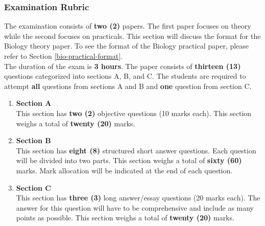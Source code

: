 \subsubsection{Examination Rubric}
\noindent The examination consists of \textbf{two (2)} papers. The first paper focuses on theory while the second focuses on practicals. This section will discuss the format for the Biology theory paper. To see the format of the Biology practical paper, please refer to Section \ref{bio-practical-format}. \\

\noindent The duration of the exam is \textbf{3 hours}. The paper consists of \textbf{thirteen (13)} questions categorized into sections A, B, and C. The students are required to attempt \textbf{all} questions from sections A and B and \textbf{one} question from section C. 
\begin{enumerate}
	\item \textbf{Section A} \\
	This section has \textbf{two (2)} objective questions (10 marks each). This section weighs a total of \textbf{twenty (20)} marks.
	
	\item \textbf{Section B} \\
	This section has \textbf{eight (8)} structured short answer questions. Each question will be divided into two parts. This section weighs a total of \textbf{sixty (60)} marks. Mark allocation will be indicated at the end of each question. 
	
	\item \textbf{Section C} \\
	This section has \textbf{three (3)} long answer\slash essay questions (20 marks each). The answer for this question will have to be comprehensive and include as many points as possible. This section weighs a total of \textbf{twenty (20)} marks. 
\end{enumerate}


